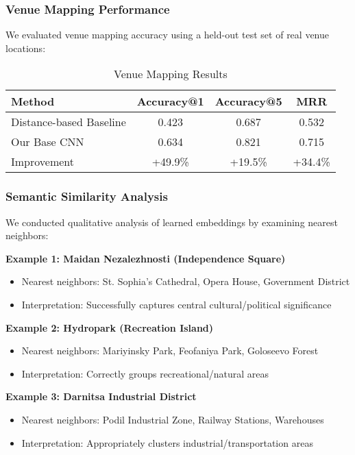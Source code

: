 \subsubsection{Venue Mapping Performance}

We evaluated venue mapping accuracy using a held-out test set of real venue locations:

\begin{table}[H]
\centering
\caption{Venue Mapping Results}
\begin{tabular}{|l|c|c|c|}
\hline
\textbf{Method} & \textbf{Accuracy@1} & \textbf{Accuracy@5} & \textbf{MRR} \\
\hline
Distance-based Baseline & 0.423 & 0.687 & 0.532 \\
Our Base CNN & 0.634 & 0.821 & 0.715 \\
Improvement & +49.9\% & +19.5\% & +34.4\% \\
\hline
\end{tabular}
\end{table}

\subsubsection{Semantic Similarity Analysis}

We conducted qualitative analysis of learned embeddings by examining nearest neighbors:

\textbf{Example 1: Maidan Nezalezhnosti (Independence Square)}
\begin{itemize}
    \item Nearest neighbors: St. Sophia's Cathedral, Opera House, Government District
    \item Interpretation: Successfully captures central cultural/political significance
\end{itemize}

\textbf{Example 2: Hydropark (Recreation Island)}
\begin{itemize}
    \item Nearest neighbors: Mariyinsky Park, Feofaniya Park, Goloseevo Forest
    \item Interpretation: Correctly groups recreational/natural areas
\end{itemize}

\textbf{Example 3: Darnitsa Industrial District}
\begin{itemize}
    \item Nearest neighbors: Podil Industrial Zone, Railway Stations, Warehouses
    \item Interpretation: Appropriately clusters industrial/transportation areas
\end{itemize}


